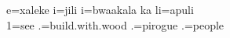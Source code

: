 %

	\ea
	\label{ex:i_jili}
	\gll e=xaleke i=jili i=bwaakala ka li=apuli\textsubscript{}\\
	 1=see .=build.with.wood .=pirogue  .=people\\	
	\glt {}
		\z



